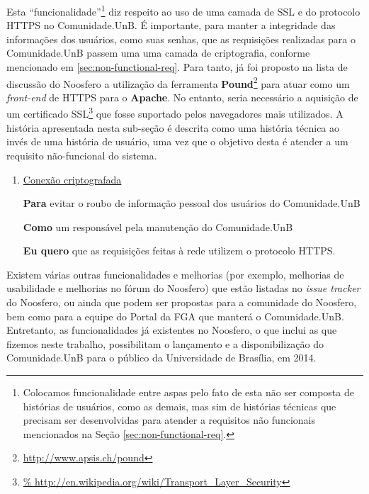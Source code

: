 Esta ``funcionalidade''\footnote{Colocamos funcionalidade entre aspas pelo
fato de esta não ser composta de histórias de usuários, como as demais, mas sim
de histórias técnicas que precisam ser desenvolvidas para atender a requisitos
não funcionais mencionados na Seção \ref{sec:non-functional-req}.} diz respeito
ao uso de uma camada de SSL e do protocolo HTTPS no Comunidade.UnB.
%
É importante, para manter a integridade das informações
dos usuários, como suas senhas, que as requisições realizadas para o
Comunidade.UnB passem uma uma camada de criptografia, conforme mencionado em
\ref{sec:non-functional-req}.
%
Para tanto, já foi proposto na lista de discussão do Noosfero a
utilização da ferramenta \textbf{Pound}\footnote{\url{http://www.apsis.ch/pound}}
para atuar como um \textit{front-end} de HTTPS para o \textbf{Apache}.
%
No entanto, seria necessário a aquisição de um certificado SSL\footnote{\url{%
http://en.wikipedia.org/wiki/Transport_Layer_Security}} que fosse suportado
pelos navegadores mais utilizados.
%
A história apresentada nesta sub-seção é descrita como uma história técnica ao
invés de uma história de usuário, uma vez que o objetivo desta é atender a
um requisito não-funcional do sistema.

\begin{enumerate}


\item \underline{Conexão criptografada}

	\textbf{Para} evitar o roubo de informação pessoal dos usuários do
Comunidade.UnB

	\textbf{Como} um responsável pela manutenção do Comunidade.UnB

	\textbf{Eu quero} que as requisições feitas à rede utilizem o protocolo
HTTPS.


\end{enumerate}

Existem várias outras funcionalidades e melhorias (por exemplo, melhorias de
usabilidade e melhorias no fórum do Noosfero) que estão listadas no
\textit{issue tracker} do Noosfero, ou ainda que podem ser propostas para
a comunidade do Noosfero, bem como para a equipe do Portal da FGA que manterá
o Comunidade.UnB.
%
Entretanto, as funcionalidades já existentes no Noosfero, o que inclui as que
fizemos neste trabalho, possibilitam o lançamento e a disponibilização do
Comunidade.UnB para o público da Universidade de Brasília, em 2014.
